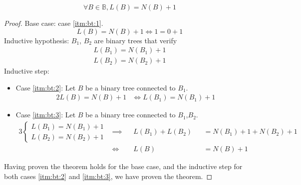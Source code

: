 \documentclass[docid=TP01]{tcom_TP}
\begin{document}
\begin{theorem}
	\begin{equation*}
		\forall B \in \mathbb{B},L(B)=N(B)+1
	\end{equation*}
\end{theorem}
\begin{proof}
	Base case: case \ref{itm:bt:1}.
	\begin{equation*}
		L(B)=N(B)+1 \iff 1=0+1
	\end{equation*}
	Inductive hypothesis: $B_1$, $B_2$ are binary trees that verify
	\begin{gather*}
		L(B_1)=N(B_1)+1\\
		L(B_2)=N(B_2)+1
	\end{gather*}
	Inductive step:
	\begin{itemize}[label={}]
		\item Case \ref{itm:bt:2}: Let $B$ be a binary tree connected to $B_1$.
			\begin{alignat*}{2}
				L(B)=N(B)+1
				&\iff L(B_1)=N(B_1)+1
			\end{alignat*}
		\item Case \ref{itm:bt:3}: Let $B$ be a binary tree connected to $B_1$,$B_2$.
			\begin{alignat*}{3}
				\begin{cases}
					L(B_1)=N(B_1)+1\\
					L(B_2)=N(B_2)+1
				\end{cases}
				&\implies &&L(B_1)+L(B_2)&&=N(B_1)+1+N(B_2)+1 \\
				&\iff     &&L(B)         &&=N(B)+1
			\end{alignat*}
	\end{itemize}
	Having proven the theorem holds for the base case, and the inductive step for both cases \ref{itm:bt:2} and \ref{itm:bt:3}, we have proven the theorem.
\end{proof}
\end{document}

